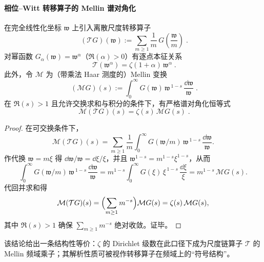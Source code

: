 \paragraph{相位--Witt 转移算子的 Mellin 谱对角化}
在完全线性化坐标 \(\mathfrak{w}\) 上引入离散尺度转移算子
\begin{equation}\label{eq:scale-transfer-operator}
\boxed{\;
(\mathcal{T}G)(\mathfrak{w})
:=\sum_{m\ge 1}\frac{1}{m}\,G\!\left(\frac{\mathfrak{w}}{m}\right)\; }.
\end{equation}
对幂函数 \(G_{\alpha}(\mathfrak{w})=\mathfrak{w}^{\alpha}\)（\(\Re(\alpha)>0\)）有逐点本征关系
\begin{equation}\label{eq:scale-transfer-eigen-monomial}
\boxed{\;
\mathcal{T}(\mathfrak{w}^{\alpha})=\zeta(1+\alpha)\,\mathfrak{w}^{\alpha}\; }.
\end{equation}
此外，令 \(\mathcal{M}\) 为（带乘法 Haar 测度的）Mellin 变换
\begin{equation}\label{eq:scale-mellin-transform}
\boxed{\;
(\mathcal{M}G)(s):=\int_{0}^{\infty} G(\mathfrak{w})\,\mathfrak{w}^{\,1-s}\,\frac{\dd \mathfrak{w}}{\mathfrak{w}}\; }.
\end{equation}
在 \(\Re(s)>1\) 且允许交换求和与积分的条件下，有严格谱对角化恒等式
\begin{equation}\label{eq:scale-mellin-diagonalization}
\boxed{\;\mathcal{M}(\mathcal{T}G)(s)=\zeta(s)\,\mathcal{M}G(s)\; }.
\end{equation}
\begin{proof}
在可交换条件下，
\[
\mathcal{M}(\mathcal{T}G)(s)
=\sum_{m\ge 1}\frac{1}{m}\int_{0}^{\infty}G(\mathfrak{w}/m)\,\mathfrak{w}^{\,1-s}\,\frac{\dd\mathfrak{w}}{\mathfrak{w}}.
\]
作代换 \(\mathfrak{w}=m\xi\) 得 \(\dd\mathfrak{w}/\mathfrak{w}=\dd\xi/\xi\)，并且 \(\mathfrak{w}^{1-s}=m^{1-s}\xi^{1-s}\)，从而
\[
\int_{0}^{\infty}G(\mathfrak{w}/m)\,\mathfrak{w}^{\,1-s}\,\frac{\dd\mathfrak{w}}{\mathfrak{w}}
=m^{1-s}\int_{0}^{\infty}G(\xi)\,\xi^{\,1-s}\,\frac{\dd\xi}{\xi}
=m^{1-s}\,\mathcal{M}G(s).
\]
代回并求和得
\[
\mathcal{M}(\mathcal{T}G)(s)
=\Bigl(\sum_{m\ge 1}m^{-s}\Bigr)\mathcal{M}G(s)
=\zeta(s)\,\mathcal{M}G(s),
\]
其中 \(\Re(s)>1\) 确保 \(\sum_{m\ge 1}m^{-s}\) 绝对收敛。证毕。
\end{proof}
该结论给出一条结构性等价：\(\zeta\) 的 Dirichlet 级数在此口径下成为尺度链算子 \(\mathcal{T}\) 的 Mellin 频域乘子；其解析性质可被视作转移算子在频域上的“符号结构”。

